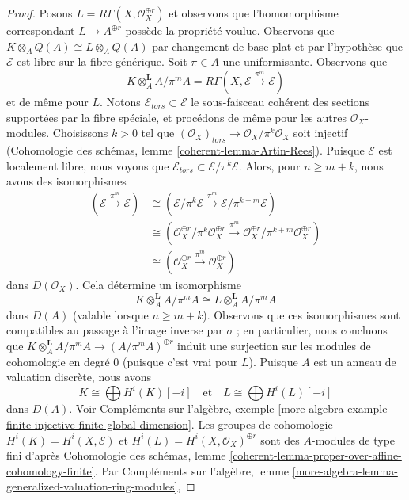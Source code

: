 \begin{proof}
\medskip\noindent
Posons $L = R\Gamma(X, \mathcal{O}_X^{\oplus r})$ et observons que
l'homomorphisme correspondant $L \to A^{\oplus r}$ possède la propriété voulue.
Observons que $K \otimes_A Q(A) \cong L \otimes_A Q(A)$
par changement de base plat et par l'hypothèse que $\mathcal{E}$
est libre sur la fibre générique. Soit $\pi \in A$ une uniformisante. Observons que
$$
K \otimes_A^\mathbf{L} A/\pi^m A =
R\Gamma(X, \mathcal{E} \xrightarrow{\pi^m} \mathcal{E})
$$
et de même pour $L$.
Notons $\mathcal{E}_{tors} \subset \mathcal{E}$ le sous-faisceau cohérent des
sections supportées par la fibre spéciale, et procédons de même pour les autres
$\mathcal{O}_X$-modules. Choisissons $k > 0$ tel que
$(\mathcal{O}_X)_{tors} \to \mathcal{O}_X/\pi^k \mathcal{O}_X$
soit injectif (Cohomologie des schémas, lemme \ref{coherent-lemma-Artin-Rees}).
Puisque $\mathcal{E}$ est localement libre, nous voyons
que $\mathcal{E}_{tors} \subset \mathcal{E}/\pi^k\mathcal{E}$.
Alors, pour $n \geq m + k$, nous avons des isomorphismes
\begin{align*}
(\mathcal{E} \xrightarrow{\pi^m} \mathcal{E})
& \cong
(\mathcal{E}/\pi^k\mathcal{E} \xrightarrow{\pi^m}
\mathcal{E}/\pi^{k + m}\mathcal{E}) \\
& \cong
(\mathcal{O}_X^{\oplus r}/\pi^k\mathcal{O}_X^{\oplus r} \xrightarrow{\pi^m}
\mathcal{O}_X^{\oplus r}/\pi^{k + m}\mathcal{O}_X^{\oplus r}) \\
& \cong
(\mathcal{O}_X^{\oplus r} \xrightarrow{\pi^m} \mathcal{O}_X^{\oplus r})
\end{align*}
dans $D(\mathcal{O}_X)$. Cela détermine un isomorphisme
$$
K \otimes_A^\mathbf{L} A/\pi^m A \cong L \otimes_A^\mathbf{L} A/\pi^m A
$$
dans $D(A)$ (valable lorsque $n \geq m + k$). Observons que ces isomorphismes
sont compatibles au passage à l'image inverse par $\sigma$ ; en particulier,
nous concluons que
$K \otimes_A^\mathbf{L} A/\pi^m A \to (A/\pi^m A)^{\oplus r}$
induit une surjection sur les modules de cohomologie en degré $0$ (puisque
c'est vrai pour $L$).
Puisque $A$ est un anneau de valuation discrète, nous avons
$$
K \cong \bigoplus H^i(K)[-i]
\quad\text{et}\quad
L \cong
\bigoplus H^i(L)[-i]
$$
dans $D(A)$. Voir Compléments sur l'algèbre, exemple
\ref{more-algebra-example-finite-injective-finite-global-dimension}.
Les groupes de cohomologie $H^i(K) = H^i(X, \mathcal{E})$ et
$H^i(L) = H^i(X, \mathcal{O}_X)^{\oplus r}$
sont des $A$-modules de type fini d'après Cohomologie des schémas, lemme
\ref{coherent-lemma-proper-over-affine-cohomology-finite}.
Par Compléments sur l'algèbre, lemme
\ref{more-algebra-lemma-generalized-valuation-ring-modules},

\end{proof}
